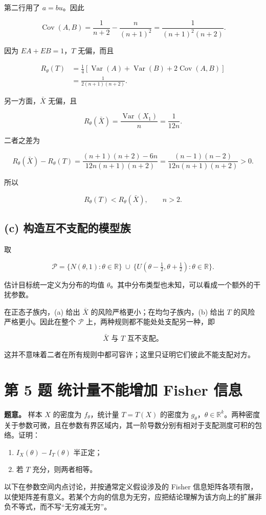 第二行用了 $a=bu$。因此

\[
\operatorname{Cov}(A,B)
=\frac1{n+2}-\frac n{(n+1)^2}
=\frac1{(n+1)^2(n+2)}.
\]

因为 $EA+EB=1$，$T$ 无偏，而且

\[
\begin{aligned}
R_\theta(T)
&=\frac14\left[\operatorname{Var}(A)+\operatorname{Var}(B)
+2\operatorname{Cov}(A,B)\right]\\
&=\boxed{\frac1{2(n+1)(n+2)}}.
\end{aligned}
\]

另一方面，$\bar X$ 无偏，且

\[
R_\theta(\bar X)=\frac{\operatorname{Var}(X_1)}n
=\frac1{12n}.
\]

二者之差为

\[
R_\theta(\bar X)-R_\theta(T)
=\frac{(n+1)(n+2)-6n}{12n(n+1)(n+2)}
=\frac{(n-1)(n-2)}{12n(n+1)(n+2)}>0.
\]

所以

\[
\boxed{R_\theta(T)<R_\theta(\bar X),\qquad n>2.}
\]

\subsection{(c) 构造互不支配的模型族}

取

\[
\boxed{\mathcal P=
\{N(\theta,1):\theta\in\mathbb R\}
\ \cup\
\{U(\theta-\tfrac12,\theta+\tfrac12):\theta\in\mathbb R\}.}
\]

估计目标统一定义为分布的均值 $\theta$。其中分布类型也未知，可以看成一个额外的干扰参数。

在正态子族内，(a) 给出 $\bar X$ 的风险严格更小；在均匀子族内，(b) 给出 $T$ 的风险严格更小。因此在整个 $\mathcal P$ 上，两种规则都不能处处支配另一种，即

\[
\boxed{\bar X\text{ 与 }T\text{ 互不支配。}}
\]

这并不意味着二者在所有规则中都可容许；这里只证明它们彼此不能支配对方。

\section{第 5 题 统计量不能增加 Fisher 信息}

\textbf{题意。} 样本 $X$ 的密度为 $f_\theta$，统计量 $T=T(X)$ 的密度为 $g_\theta$，$\theta\in\mathbb R^k$。两种密度关于参数可微，且在参数有界区域内，其一阶导数分别有相对于支配测度可积的包络。证明：

\begin{enumerate}
\item $I_X(\theta)-I_T(\theta)$ 半正定；
\item 若 $T$ 充分，则两者相等。

\end{enumerate}
以下在参数空间内点讨论，并按通常定义假设涉及的 Fisher 信息矩阵各项有限，以使矩阵差有意义。若某个方向的信息为无穷，应把结论理解为该方向上的扩展非负不等式，而不写“无穷减无穷”。

